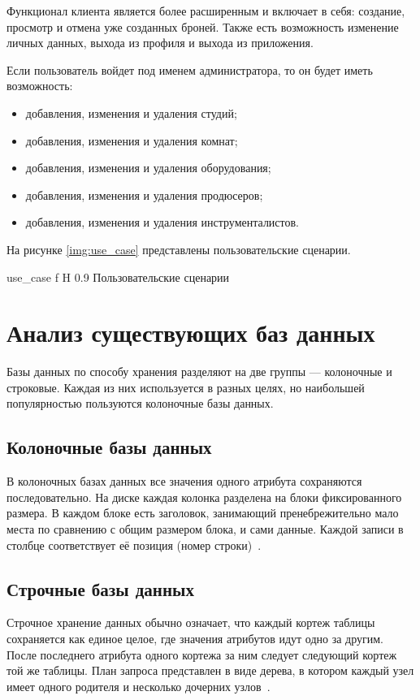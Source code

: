 Функционал клиента является более расширенным и включает в себя: создание, просмотр и отмена уже созданных броней. 
Также есть возможность изменение личных данных, выхода из профиля и выхода из приложения.

Если пользователь войдет под именем администратора, то он будет иметь возможность:
\begin{itemize}
	\item добавления, изменения и удаления студий;
	\item добавления, изменения и удаления комнат;
	\item добавления, изменения и удаления оборудования;
	\item добавления, изменения и удаления продюсеров;
	\item добавления, изменения и удаления инструменталистов.
\end{itemize}
		
На рисунке \ref{img:use_case} представлены пользовательские сценарии.


{use_case} %
{f} %
{H} %
{0.9\textwidth} %
{Пользовательские сценарии} %



\section{Анализ существующих баз данных}
Базы данных по способу хранения разделяют на две группы --- колоночные и строковые.
Каждая из них используется в разных целях, но наибольшей популярностью пользуются колоночные базы данных.

\subsection{Колоночные базы данных}
В колоночных базах данных все значения одного атрибута сохраняются последовательно. На диске каждая колонка разделена на блоки фиксированного размера.
В каждом блоке есть заголовок, занимающий пренебрежительно мало места по сравнению с общим размером блока, и сами данные.
Каждой записи в столбце соответствует её позиция (номер строки)~\cite{strokovie_and_kolonochnie_bd}.
\subsection{Строчные базы данных}
Строчное хранение данных обычно означает, что каждый кортеж таблицы сохраняется как единое целое, где значения атрибутов идут одно за другим.
После последнего атрибута одного кортежа за ним следует следующий кортеж той же таблицы.
План запроса представлен в виде дерева, в котором каждый узел имеет одного родителя и несколько дочерних узлов~\cite{strokovie_and_kolonochnie_bd}.


